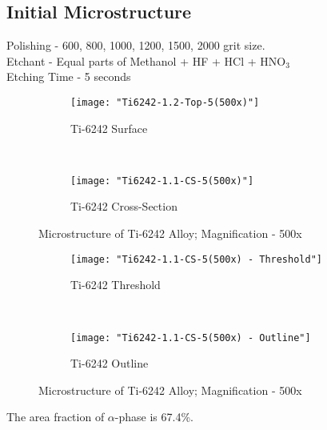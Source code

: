 \subsection{Initial Microstructure}
Polishing - 600, 800, 1000, 1200, 1500, 2000 grit size. \\
Etchant - Equal parts of Methanol + HF + HCl + HNO$_{3}$ \\
Etching Time - 5 seconds

\begin{figure}[H]
    \centering
    \begin{subfigure}{0.49\textwidth}
        \texttt{[image: "Ti6242-1.2-Top-5(500x)"]}
        \caption{Ti-6242 Surface}
        \label{fig:Ti-6242 Surface}
    \end{subfigure}
    ~
    \begin{subfigure}{0.49\textwidth}
        \texttt{[image: "Ti6242-1.1-CS-5(500x)"]}
        \caption{Ti-6242 Cross-Section}
        \label{fig:Ti-6242 Cross-Section}
    \end{subfigure}
  
    \caption{Microstructure of Ti-6242 Alloy; Magnification - 500x}
    \label{fig:As-Received}
\end{figure}

\begin{figure}[H]
    \centering
    \begin{subfigure}{0.49\textwidth}
        \texttt{[image: "Ti6242-1.1-CS-5(500x) - Threshold"]}
        \caption{Ti-6242 Threshold}
        \label{fig:Ti-6242 Threshold}
    \end{subfigure}
    ~
    \begin{subfigure}{0.49\textwidth}
        \texttt{[image: "Ti6242-1.1-CS-5(500x) - Outline"]}
        \caption{Ti-6242 Outline}
        \label{fig:Ti-6242 Outline}
    \end{subfigure}
  
    \caption{Microstructure of Ti-6242 Alloy; Magnification - 500x}
    \label{fig:As-Received}
\end{figure}


The area fraction of $\alpha$-phase is 67.4\%.